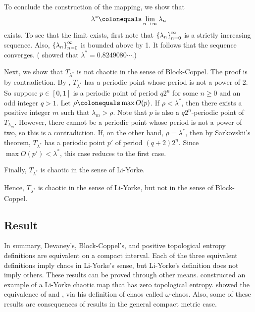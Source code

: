 \documentclass[12pt,twoside,draft]{book}
\begin{document}
\begin{example}
To conclude the construction of the mapping, we show that
\begin{equation*}
  \lambda^* \ceq \lim\limits_{n \to \infty} \lambda_n
\end{equation*}
exists.
To see that the limit exists, first note that $\left \{ \lambda_n \right \}^{\infty}_{n = 0}$ is a strictly increasing sequence.
Also, $\left \{ \lambda_n \right \}^{\infty}_{n = 0}$ is bounded above by 1.
It follows that the sequence converges.
(\citet{misiurewicz1} showed that $\lambda^* = 0.8249080 \cdots$.)

Next, we show that $T_{\lambda^*}$ is not chaotic in the sense of Block-Coppel.
The proof is by contradiction.
By \citet[II, Theorem 14]{blockcoppel}, $T_{\lambda^*}$ has a periodic point whose period is not a power of 2.
So suppose $p \in [0,1]$ is a periodic point of period $q2^n$ for some $n \geq 0$ and an odd integer $q > 1$.
Let $\rho \ceq \max O(p)$.
If $\rho < \lambda^*$, then there exists a positive integer $m$ such that $\lambda_m > \rho$.
Note that $p$ is also a $q2^n$-periodic point of $T_{\lambda_m}$.
However, there cannot be a periodic point whose period is not a power of two, so this is a contradiction.
If, on the other hand, $\rho = \lambda^*$, then by Sarkovskii's theorem, $T_{\lambda^*}$ has a periodic point $p'$ of period $(q+2) 2^n$.
Since $\max O(p') < \lambda^*$, this case reduces to the first case.

Finally, $T_{\lambda^*}$ is chaotic in the sense of Li-Yorke.

Hence, $T_{\lambda^*}$ is chaotic in the sense of Li-Yorke, but not in the sense of Block-Coppel.


\label{eg:counterexample}
\end{example}

\subsection*{Result}
In summary, Devaney's, Block-Coppel's, and positive topological entropy definitions are equivalent on a compact interval.
Each of the three equivalent definitions imply chaos in Li-Yorke's sense, but Li-Yorke's definition does not imply others.
These results can be proved through other means.
\citet{smital} constructed an example of a Li-Yorke chaotic map that has zero topological entropy.
\citet{omegachaos} showed the equivalence of \dev and \pte, via his definition of chaos called $\omega$-chaos.
Also, some of these results are consequences of results in the general compact metric case.
\end{document}
